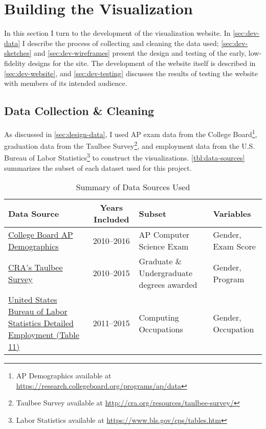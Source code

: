 \section{Building the Visualization}\label{sec:dev}
In this section I turn to the development of the visualization website. In \autoref{sec:dev-data} I describe the process of collecting and cleaning the data used; \autoref{sec:dev-sketches} and \autoref{sec:dev-wireframes} present the design and testing of the early, low-fidelity designs for the site. The development of the website itself is described in \autoref{sec:dev-website}, and \autoref{sec:dev-testing} discusses the results of testing the website with members of its intended audience.

\subsection{Data Collection \& Cleaning}\label{sec:dev-data}
As discussed in \autoref{sec:design-data}, I used AP exam data from the College Board\footnote{AP Demographics available at \url{https://research.collegeboard.org/programs/ap/data}}, graduation data from the Taulbee Survey\footnote{Taulbee Survey available at \url{http://cra.org/resources/taulbee-survey/}}, and employment data from the U.S. Bureau of Labor Statistics\footnote{Labor Statistics available at \url{https://www.bls.gov/cps/tables.htm}}
 to construct the visualizations. \autoref{tbl:data-sources} summarizes the subset of each dataset used for this project.

\begin{table}
  \begin{tabular}{L{3.6cm}cL{4cm}l} \hline
    \textbf{Data Source} & \textbf{Years Included} & \textbf{Subset} & \textbf{Variables} \\ \hline
    \href{https://research.collegeboard.org/programs/ap/data}{College Board AP Demographics}
      & 2010--2016
      & AP Computer Science Exam
      & Gender, Exam Score \\
    \href{http://cra.org/resources/taulbee-survey/}{CRA's Taulbee Survey}
      & 2010--2015
      & Graduate \& Undergraduate degrees awarded
      & Gender, Program \\
    \href{https://www.bls.gov/cps/tables.htm}{United States Bureau of Labor Statistics Detailed Employment (Table 11)}
      & 2011--2015
      & Computing Occupations
      & Gender, Occupation \\ \hline
  \end{tabular}
  \caption{Summary of Data Sources Used}\label{tbl:data-sources}
\end{table}

